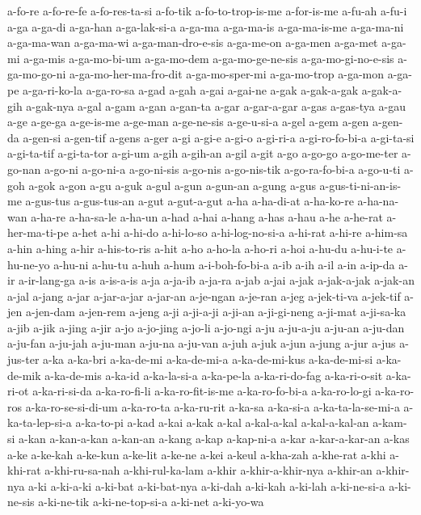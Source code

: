 {a-fo-re a-fo-re-fe a-fo-res-ta-si a-fo-tik a-fo-to-trop-is-me a-for-is-me
a-fu-ah a-fu-i a-ga a-ga-di a-ga-han a-ga-lak-si-a a-ga-ma a-ga-ma-is
a-ga-ma-is-me a-ga-ma-ni a-ga-ma-wan a-ga-ma-wi a-ga-man-dro-e-sis
a-ga-me-on a-ga-men a-ga-met a-ga-mi a-ga-mis a-ga-mo-bi-um a-ga-mo-dem
a-ga-mo-ge-ne-sis a-ga-mo-gi-no-e-sis a-ga-mo-go-ni a-ga-mo-her-ma-fro-dit
a-ga-mo-sper-mi a-ga-mo-trop a-ga-mon a-ga-pe a-ga-ri-ko-la a-ga-ro-sa
a-gad a-gah a-gai a-gai-ne a-gak a-gak-a-gak a-gak-a-gih a-gak-nya a-gal
a-gam a-gan a-gan-ta a-gar a-gar-a-gar a-gas a-gas-tya a-gau a-ge a-ge-ga
a-ge-is-me a-ge-man a-ge-ne-sis a-ge-u-si-a a-gel a-gem a-gen a-gen-da
a-gen-si a-gen-tif a-gens a-ger a-gi a-gi-e a-gi-o a-gi-ri-a
a-gi-ro-fo-bi-a a-gi-ta-si a-gi-ta-tif a-gi-ta-tor a-gi-um a-gih a-gih-an
a-gil a-git a-go a-go-go a-go-me-ter a-go-nan a-go-ni a-go-ni-a
a-go-ni-sis a-go-nis a-go-nis-tik a-go-ra-fo-bi-a a-go-u-ti a-goh a-gok
a-gon a-gu a-guk a-gul a-gun a-gun-an a-gung a-gus a-gus-ti-ni-an-is-me
a-gus-tus a-gus-tus-an a-gut a-gut-a-gut a-ha a-ha-di-at a-ha-ko-re
a-ha-na-wan a-ha-re a-ha-sa-le a-ha-un a-had a-hai a-hang a-has a-hau a-he
a-he-rat a-her-ma-ti-pe a-het a-hi a-hi-do a-hi-lo-so a-hi-log-no-si-a
a-hi-rat a-hi-re a-him-sa a-hin a-hing a-hir a-his-to-ris a-hit a-ho
a-ho-la a-ho-ri a-hoi a-hu-du a-hu-i-te a-hu-ne-yo a-hu-ni a-hu-tu a-huh
a-hum a-i-boh-fo-bi-a a-ib a-ih a-il a-in a-ip-da a-ir a-ir-lang-ga a-is
a-is-a-is a-ja a-ja-ib a-ja-ra a-jab a-jai a-jak a-jak-a-jak a-jak-an
a-jal a-jang a-jar a-jar-a-jar a-jar-an a-je-ngan a-je-ran a-jeg
a-jek-ti-va a-jek-tif a-jen a-jen-dam a-jen-rem a-jeng a-ji a-ji-a-ji
a-ji-an a-ji-gi-neng a-ji-mat a-ji-sa-ka a-jib a-jik a-jing a-jir a-jo
a-jo-jing a-jo-li a-jo-ngi a-ju a-ju-a-ju a-ju-an a-ju-dan a-ju-fan
a-ju-jah a-ju-man a-ju-na a-ju-van a-juh a-juk a-jun a-jung a-jur a-jus
a-jus-ter a-ka a-ka-bri a-ka-de-mi a-ka-de-mi-a a-ka-de-mi-kus
a-ka-de-mi-si a-ka-de-mik a-ka-de-mis a-ka-id a-ka-la-si-a a-ka-pe-la
a-ka-ri-do-fag a-ka-ri-o-sit a-ka-ri-ot a-ka-ri-si-da a-ka-ro-fi-li
a-ka-ro-fit-is-me a-ka-ro-fo-bi-a a-ka-ro-lo-gi a-ka-ro-ros
a-ka-ro-se-si-di-um a-ka-ro-ta a-ka-ru-rit a-ka-sa a-ka-si-a
a-ka-ta-la-se-mi-a a-ka-ta-lep-si-a a-ka-to-pi a-kad a-kai a-kak a-kal
a-kal-a-kal a-kal-a-kal-an a-kam-si a-kan a-kan-a-kan a-kan-an a-kang
a-kap a-kap-ni-a a-kar a-kar-a-kar-an a-kas a-ke a-ke-kah a-ke-kun
a-ke-lit a-ke-ne a-kei a-keul a-kha-zah a-khe-rat a-khi a-khi-rat
a-khi-ru-sa-nah a-khi-rul-ka-lam a-khir a-khir-a-khir-nya a-khir-an
a-khir-nya a-ki a-ki-a-ki a-ki-bat a-ki-bat-nya a-ki-dah a-ki-kah a-ki-lah
a-ki-ne-si-a a-ki-ne-sis a-ki-ne-tik a-ki-ne-top-si-a a-ki-net a-ki-yo-wa
}
